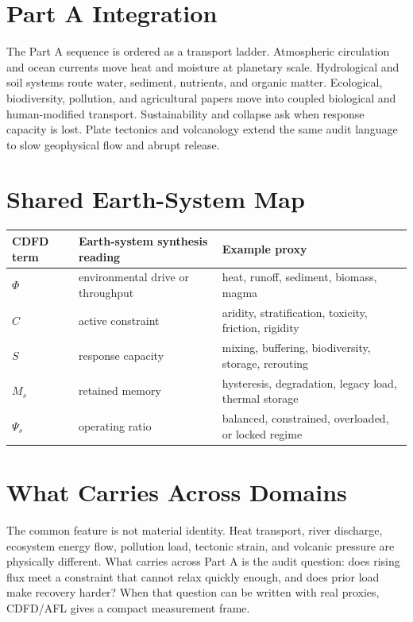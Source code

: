\documentclass[12pt,a4paper]{article}
\begin{document}
\section{Part A Integration}

The Part A sequence is ordered as a transport ladder. Atmospheric circulation
and ocean currents move heat and moisture at planetary scale. Hydrological and
soil systems route water, sediment, nutrients, and organic matter. Ecological,
biodiversity, pollution, and agricultural papers move into coupled biological
and human-modified transport. Sustainability and collapse ask when response
capacity is lost. Plate tectonics and volcanology extend the same audit
language to slow geophysical flow and abrupt release.

\section{Shared Earth-System Map}

\begin{table}[h]
\centering
\begin{tabularx}{\textwidth}{@{}lXX@{}}
\toprule
CDFD term & Earth-system synthesis reading & Example proxy \\
\midrule
$\Phi$ & environmental drive or throughput & heat, runoff, sediment, biomass, magma \\
$C$ & active constraint & aridity, stratification, toxicity, friction, rigidity \\
$S$ & response capacity & mixing, buffering, biodiversity, storage, rerouting \\
$M_s$ & retained memory & hysteresis, degradation, legacy load, thermal storage \\
$\Psi_s$ & operating ratio & balanced, constrained, overloaded, or locked regime \\
\bottomrule
\end{tabularx}
\end{table}

\section{What Carries Across Domains}

The common feature is not material identity. Heat transport, river discharge,
ecosystem energy flow, pollution load, tectonic strain, and volcanic pressure
are physically different. What carries across Part A is the audit question:
does rising flux meet a constraint that cannot relax quickly enough, and does
prior load make recovery harder? When that question can be written with real
proxies, CDFD/AFL gives a compact measurement frame.
\end{document}
